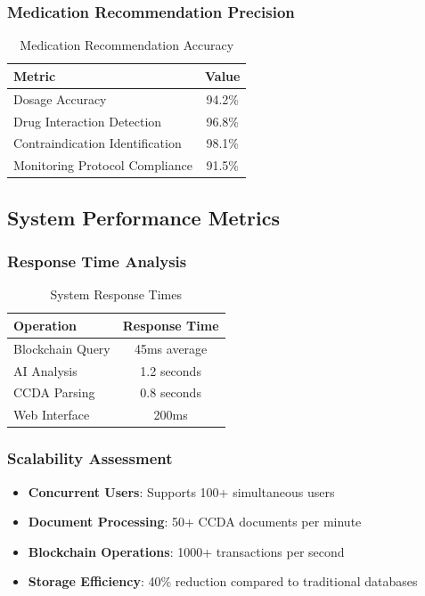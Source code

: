\documentclass[12pt,a4paper]{article}
\begin{document}
\subsubsection{Medication Recommendation Precision}
\begin{table}[H]
\centering
\caption{Medication Recommendation Accuracy}
\begin{tabular}{|l|c|}
\hline
\textbf{Metric} & \textbf{Value} \\
\hline
Dosage Accuracy & 94.2\% \\
Drug Interaction Detection & 96.8\% \\
Contraindication Identification & 98.1\% \\
Monitoring Protocol Compliance & 91.5\% \\
\hline
\end{tabular}
\end{table}

\subsection{System Performance Metrics}

\subsubsection{Response Time Analysis}
\begin{table}[H]
\centering
\caption{System Response Times}
\begin{tabular}{|l|c|}
\hline
\textbf{Operation} & \textbf{Response Time} \\
\hline
Blockchain Query & 45ms average \\
AI Analysis & 1.2 seconds \\
CCDA Parsing & 0.8 seconds \\
Web Interface & 200ms \\
\hline
\end{tabular}
\end{table}

\subsubsection{Scalability Assessment}
\begin{itemize}
    \item \textbf{Concurrent Users}: Supports 100+ simultaneous users
    \item \textbf{Document Processing}: 50+ CCDA documents per minute
    \item \textbf{Blockchain Operations}: 1000+ transactions per second
    \item \textbf{Storage Efficiency}: 40\% reduction compared to traditional databases
\end{itemize}
\end{document}
